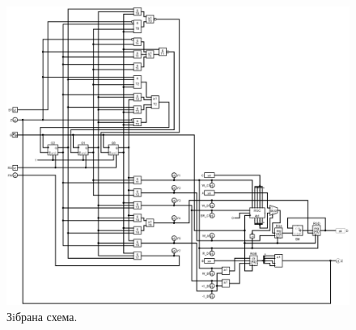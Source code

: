 \documentclass[a4paper, 10pt]{article}
\begin{document}
\begin{figure}[H]
\begin{center}
\includegraphics[scale=0.4, angle=90]{lab1.png}
\caption{Зiбрана схема.}
\end{center}
\end{figure}
\end{document}
